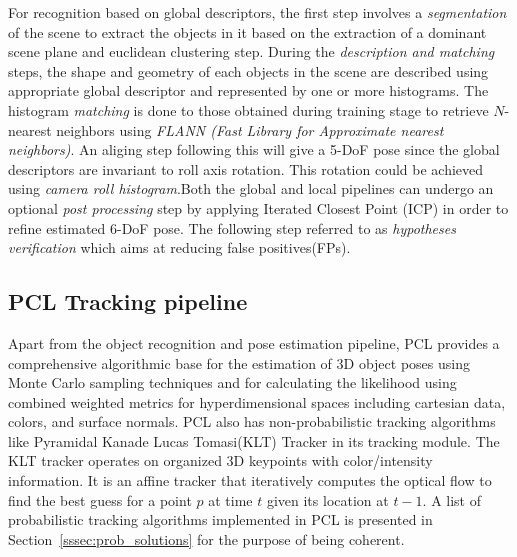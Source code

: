 	For recognition based on global descriptors, the first step involves a \emph{segmentation} of the scene to extract the objects in it based on the extraction of a dominant scene plane and euclidean clustering step. During the \emph{description and matching} steps, the shape and geometry of each objects in the scene are described using appropriate global descriptor and represented by one or more histograms. The histogram \emph{matching} is done to those obtained during training stage to retrieve $N$-nearest neighbors using \emph{FLANN (Fast Library for Approximate nearest neighbors)}. An aliging step following this will give a 5-DoF pose since the global descriptors are invariant to roll axis rotation. This rotation could be achieved using \emph{camera roll histogram}.Both the global and local pipelines can undergo an optional \emph{post processing} step by applying Iterated Closest Point (ICP) in order to refine estimated 6-DoF pose. The following step referred to as \emph{hypotheses verification} which aims at reducing false positives(FPs).
\subsection{PCL Tracking pipeline}
	Apart from the object recognition and pose estimation pipeline, PCL \cite{RUeda2012} provides a comprehensive algorithmic base for the estimation of 3D object poses using Monte Carlo sampling techniques and for calculating the likelihood using combined weighted metrics for hyperdimensional spaces including cartesian data, colors, and surface normals. PCL also has non-probabilistic tracking algorithms like Pyramidal Kanade Lucas Tomasi(KLT) Tracker in its tracking module. The KLT tracker operates on organized 3D keypoints with color/intensity information. It is an affine tracker that iteratively computes the optical flow to find the best guess for a point $p$ at time $t$ given its location at $t-1$. A list of probabilistic tracking algorithms implemented in PCL is presented in Section~\ref{sssec:prob_solutions} for the purpose of being coherent.
